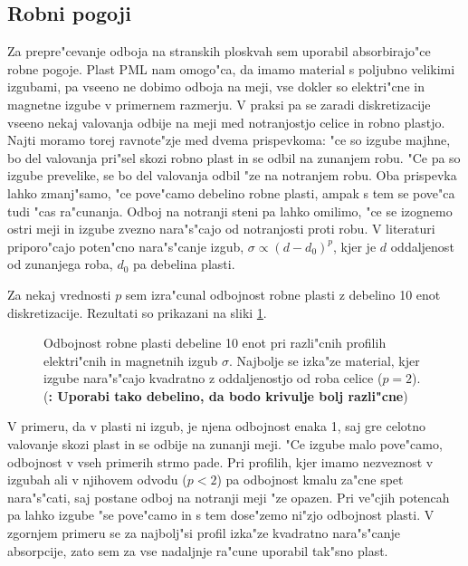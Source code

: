 \documentclass[a4paper,10pt]{article}
\newcommand{\todo}[1]{(\textbf{\textsmaller{TODO}: #1})}
\begin{document}
\subsection{Robni pogoji}
Za prepre"cevanje odboja na stranskih ploskvah sem uporabil absorbirajo"ce robne pogoje. 
Plast \acs{PML} nam omogo"ca, da imamo material s poljubno velikimi izgubami, pa vseeno ne dobimo odboja na meji, vse dokler so elektri"cne in magnetne izgube v primernem razmerju. 
V praksi pa se zaradi diskretizacije vseeno nekaj valovanja odbije na meji med notranjostjo celice in robno plastjo. 
Najti moramo torej ravnote"zje med dvema prispevkoma: "ce so izgube majhne, bo del valovanja pri"sel skozi robno plast in se odbil na zunanjem robu. 
"Ce pa so izgube prevelike, se bo del valovanja odbil "ze na notranjem robu. 
Oba prispevka lahko zmanj"samo, "ce pove"camo debelino robne plasti, ampak s tem se pove"ca tudi "cas ra"cunanja. 
Odboj na notranji steni pa lahko omilimo, "ce se izognemo ostri meji in izgube zvezno nara"s"cajo od notranjosti proti robu. 
V literaturi\cite{taflove} priporo"cajo poten"cno nara"s"canje izgub, $\sigma \propto (d-d_0)^{p}$, kjer je $d$ oddaljenost od zunanjega roba, $d_0$ pa debelina plasti. 

Za nekaj vrednosti $p$ sem izra"cunal odbojnost robne plasti z debelino 10 enot diskretizacije. 
Rezultati so prikazani na sliki \ref{fig:test-absorption}. 

\begin{figure}[!htbp]
 
 \caption{Odbojnost robne plasti debeline 10 enot pri razli"cnih profilih elektri"cnih in magnetnih izgub $\sigma$. Najbolje se izka"ze material, kjer izgube nara"s"cajo kvadratno z oddaljenostjo od roba celice ($p=2$). 
 \todo{Uporabi tako debelino, da bodo krivulje bolj razli"cne}
 }
 \label{fig:test-absorption}
\end{figure}

V primeru, da v plasti ni izgub, je njena odbojnost enaka 1, saj gre celotno valovanje skozi plast in se odbije na zunanji meji. 
"Ce izgube malo pove"camo, odbojnost v vseh primerih strmo pade. 
Pri profilih, kjer imamo nezveznost v izgubah ali v njihovem odvodu ($p<2$) pa odbojnost kmalu za"cne spet nara"s"cati, saj postane odboj na notranji meji "ze opazen.
Pri ve"cjih potencah pa lahko izgube "se pove"camo in s tem dose"zemo ni"zjo odbojnost plasti. 
V zgornjem primeru se za najbolj"si profil izka"ze kvadratno nara"s"canje absorpcije, zato sem za vse nadaljnje ra"cune uporabil tak"sno plast. 

\newpage
\end{document}
